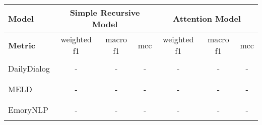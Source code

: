 \begin{tabular}{|l|c|c|c||c|c|c|}
        \hline
        \textbf{Model} & \multicolumn{3}{c||}{\textbf{Simple Recursive Model}} & \multicolumn{3}{c|}{\textbf{Attention Model}} \\
        \hline
        \textbf{Metric} & weighted f1 & macro f1 & mcc & weighted f1 & macro f1 & mcc \\
        \hline
                    &   &   &   &   &   &   \\
        DailyDialog & - & - & - & - & - & - \\
                    &   &   &   &   &   &   \\
        \hline
                    &   &   &   &   &   &   \\
        MELD        & - & - & - & - & - & - \\
                    &   &   &   &   &   &   \\
        \hline
                    &   &   &   &   &   &   \\
        EmoryNLP    & - & - & - & - & - & - \\
                    &   &   &   &   &   &   \\


        \hline
\end{tabular}

